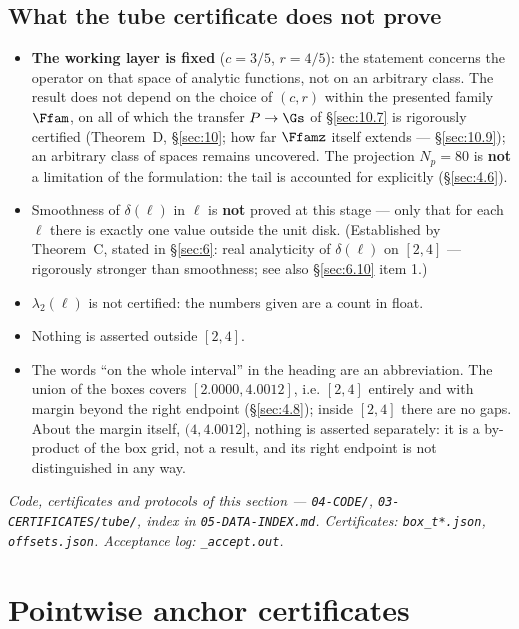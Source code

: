 \subsection{What the tube certificate does not prove}\label{sec:4.11}
\begin{itemize}
\item \textbf{The working layer is fixed} ($c = 3/5$, $r = 4/5$): the statement concerns the
  operator on that space of analytic functions, not on an arbitrary class. The
  result does not depend on the choice of $(c, r)$ within the presented family
  $\Ffam$, on all of which the transfer $P \to \Gs$ of \S\ref{sec:10.7} is rigorously
  certified (Theorem~D, \S\ref{sec:10}; how far $\Ffamz$ itself extends --- \S\ref{sec:10.9}); an
  arbitrary class of spaces remains uncovered. The projection $N_{p} = 80$ is
  \textbf{not} a limitation of the formulation: the tail is accounted for explicitly (\S\ref{sec:4.6}).
\item Smoothness of $\delta(\ell)$ in $\ell$ is \textbf{not} proved at this stage --- only that for each
  $\ell$ there is exactly one value outside the unit disk. (Established by
  Theorem~C, stated in \S\ref{sec:6}: real analyticity of $\delta(\ell)$ on $[2,4]$ --- rigorously stronger than
  smoothness; see also \S\ref{sec:6.10} item 1.)
\item $\lambda_{2}(\ell)$ is not certified: the numbers given are a count in float.
\item Nothing is asserted outside $[2,4]$.
\item The words ``on the whole interval'' in the heading are an abbreviation. The
  union of the boxes covers $[2.0000, 4.0012]$, i.e. $[2,4]$ entirely and with
  margin beyond the right endpoint (\S\ref{sec:4.8}); inside $[2,4]$ there are no gaps.
  About the margin itself, $(4, 4.0012]$, nothing is asserted separately: it is a
  by-product of the box grid, not a result, and its right endpoint is not
  distinguished in any way.
\end{itemize}

\emph{Code, certificates and protocols of this section --- \texttt{04-CODE/}, \texttt{03-\allowbreak CERTIFICATES/\allowbreak tube/\allowbreak }, index in \texttt{05-\allowbreak DATA-\allowbreak INDEX.md}. Certificates: \texttt{box\_t*.json}, \texttt{offsets.json}. Acceptance log: \texttt{\_accept.out}.}



\section{Pointwise anchor certificates}
\label{sec:5}

